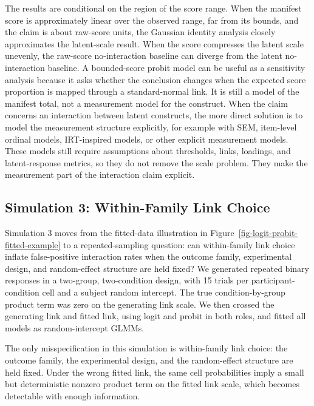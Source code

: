 \documentclass[
  man,
  longtable,
  nolmodern,
  notxfonts,
  notimes,
  colorlinks=true,linkcolor=blue,citecolor=blue,urlcolor=blue]{apa7}
\begin{document}
The results are conditional on the region of the score range. When the
manifest score is approximately linear over the observed range, far from
its bounds, and the claim is about raw-score units, the Gaussian
identity analysis closely approximates the latent-scale result. When the
score compresses the latent scale unevenly, the raw-score no-interaction
baseline can diverge from the latent no-interaction baseline. A
bounded-score probit model can be useful as a sensitivity analysis
because it asks whether the conclusion changes when the expected score
proportion is mapped through a standard-normal link. It is still a model
of the manifest total, not a measurement model for the construct. When
the claim concerns an interaction between latent constructs, the more
direct solution is to model the measurement structure explicitly, for
example with SEM, item-level ordinal models, IRT-inspired models, or
other explicit measurement models. These models still require
assumptions about thresholds, links, loadings, and latent-response
metrics, so they do not remove the scale problem. They make the
measurement part of the interaction claim explicit.

\subsection{Simulation 3: Within-Family Link
Choice}\label{simulation-3-within-family-link-choice}

Simulation 3 moves from the fitted-data illustration in
Figure~\ref{fig-logit-probit-fitted-example} to a repeated-sampling
question: can within-family link choice inflate false-positive
interaction rates when the outcome family, experimental design, and
random-effect structure are held fixed? We generated repeated binary
responses in a two-group, two-condition design, with 15 trials per
participant-condition cell and a subject random intercept. The true
condition-by-group product term was zero on the generating link scale.
We then crossed the generating link and fitted link, using logit and
probit in both roles, and fitted all models as random-intercept GLMMs.

The only misspecification in this simulation is within-family link
choice: the outcome family, the experimental design, and the
random-effect structure are held fixed. Under the wrong fitted link, the
same cell probabilities imply a small but deterministic nonzero product
term on the fitted link scale, which becomes detectable with enough
information.
\end{document}
